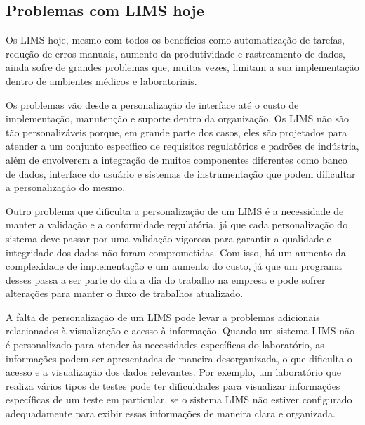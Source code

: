 \subsection{Problemas com LIMS hoje}


Os LIMS hoje, mesmo com todos os benefícios como automatização de tarefas, redução de erros manuais, aumento da produtividade e rastreamento de dados, ainda sofre de grandes problemas que, muitas vezes, limitam a sua implementação dentro de ambientes médicos e laboratoriais.

Os problemas vão desde a personalização de interface até o custo de implementação, manutenção e suporte dentro da organização.
Os LIMS não são tão personalizáveis porque, em grande parte dos casos, eles são projetados para atender a um conjunto específico de requisitos regulatórios e padrões de indústria, além de envolverem a integração de muitos componentes diferentes como banco de dados, interface do usuário e sistemas de instrumentação que podem dificultar a personalização do mesmo.

Outro problema que dificulta a personalização de um LIMS é a necessidade de manter a validação e a conformidade regulatória, já que cada personalização do sistema deve passar por uma validação vigorosa para garantir a qualidade e integridade dos dados não foram comprometidas.
Com isso, há um aumento da complexidade de implementação e um aumento do custo, já que um programa desses passa a ser parte do dia a dia do trabalho na empresa e pode sofrer alterações para manter o fluxo de trabalhos atualizado.



A falta de personalização de um LIMS pode levar a problemas adicionais relacionados à visualização e acesso à informação. Quando um sistema LIMS não é personalizado para atender às necessidades específicas do laboratório, as informações podem ser apresentadas de maneira desorganizada, o que dificulta o acesso e a visualização dos dados relevantes. Por exemplo, um laboratório que realiza vários tipos de testes pode ter dificuldades para visualizar informações específicas de um teste em particular, se o sistema LIMS não estiver configurado adequadamente para exibir essas informações de maneira clara e organizada.


